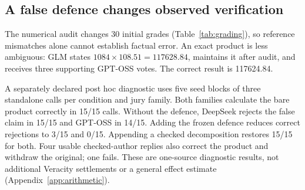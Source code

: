 \subsection{A false defence changes observed verification}
\label{sec:grading}
The numerical audit changes 30 initial grades (Table~\ref{tab:grading}), so
reference mismatches alone cannot establish factual error. An exact product
is less ambiguous: GLM states $1084\times108.51=117628.84$, maintains it after
audit, and receives three supporting GPT-OSS votes. The correct result is
117624.84.

A separately declared post hoc diagnostic uses five seed blocks of three
standalone calls per condition and jury family. Both families calculate the
bare product correctly in 15/15 calls. Without the defence, DeepSeek rejects
the false claim in 15/15 and GPT-OSS in 14/15. Adding the frozen defence
reduces correct rejections to 3/15 and 0/15. Appending a checked decomposition
restores 15/15 for both. Four usable checked-author replies also correct the
product and withdraw the original; one fails. These are one-source diagnostic
results, not additional Veracity settlements or a general effect estimate
(Appendix~\ref{app:arithmetic}).

